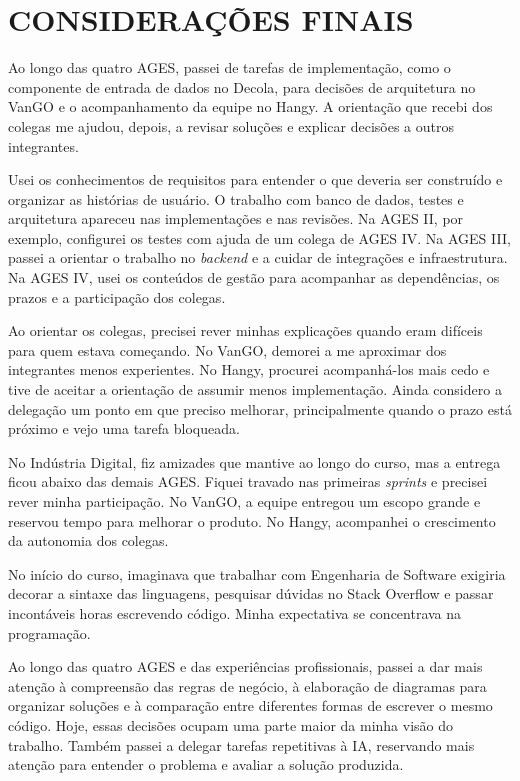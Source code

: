 \chapter[Considerações Finais]{CONSIDERAÇÕES FINAIS}

Ao longo das quatro AGES, passei de tarefas de implementação, como o
componente de entrada de dados no Decola, para decisões de arquitetura no
VanGO e o acompanhamento da equipe no Hangy. A orientação que recebi dos
colegas me ajudou, depois, a revisar soluções e explicar decisões a outros
integrantes.

Usei os conhecimentos de requisitos para entender o que deveria ser
construído e organizar as histórias de usuário. O trabalho com banco de dados,
testes e arquitetura
apareceu nas implementações e nas revisões. Na AGES II, por exemplo,
configurei os testes com ajuda de um colega de AGES IV. Na AGES III, passei
a orientar o trabalho no \textit{backend} e a cuidar de integrações e
infraestrutura. Na AGES IV, usei os conteúdos de gestão para acompanhar as
dependências, os prazos e a participação dos colegas.

Ao orientar os colegas, precisei rever minhas explicações quando eram
difíceis para quem estava começando.
No VanGO, demorei a me aproximar dos integrantes menos experientes. No Hangy,
procurei acompanhá-los mais cedo e tive de aceitar a orientação de assumir
menos implementação. Ainda considero a delegação um ponto em que preciso
melhorar, principalmente quando o prazo está próximo e vejo uma tarefa
bloqueada.

No Indústria Digital, fiz amizades que mantive ao longo do curso, mas a
entrega ficou abaixo das demais AGES. Fiquei travado nas primeiras
\textit{sprints} e precisei rever minha participação. No VanGO, a equipe
entregou um escopo grande e reservou tempo para melhorar o produto. No
Hangy, acompanhei o crescimento da autonomia dos colegas.

No início do curso, imaginava que trabalhar com Engenharia de Software
exigiria decorar a sintaxe das linguagens, pesquisar dúvidas no Stack
Overflow e passar incontáveis horas escrevendo código. Minha expectativa
se concentrava na programação.

Ao longo das quatro AGES e das experiências profissionais, passei a dar
mais atenção à compreensão das regras de negócio, à elaboração de diagramas
para organizar soluções e à comparação entre diferentes formas de escrever
o mesmo código. Hoje, essas decisões ocupam uma parte maior da minha visão
do trabalho. Também passei a delegar tarefas repetitivas à IA, reservando
mais atenção para entender o problema e avaliar a solução produzida.

